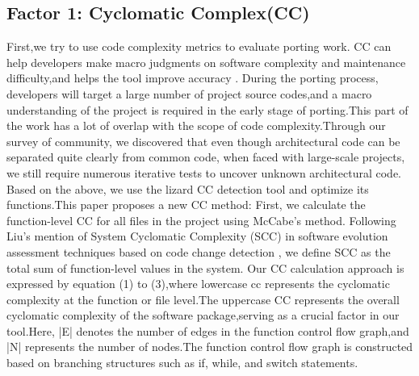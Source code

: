 \documentclass[sigconf,screen,review,anonymous]{acmart}
\begin{document}
\subsection{Factor 1: Cyclomatic Complex(CC)}
\label{sec:factor-1}
First,we try to use code complexity metrics to evaluate porting work.
CC can help developers make macro judgments on software complexity and maintenance difficulty,and helps the tool improve accuracy \cite{2005Exploring}.
During the porting process, developers will target a large number of project source codes,and a macro understanding of the project is required in the early stage of porting.This part of the work has a lot of overlap with the scope of code complexity.Through our survey of community, we discovered that even though architectural code can be separated quite clearly from common code, when faced with large-scale projects, we still require numerous iterative tests to uncover unknown architectural code.
Based on the above, we use the lizard CC detection tool and optimize its functions.This paper proposes a new CC method:
 First, we calculate the function-level CC for all files in the project using McCabe's method. Following Liu's mention of System Cyclomatic Complexity (SCC) in software evolution assessment techniques based on code change detection \cite{liuhuihui00}, we define SCC as the total sum of function-level values in the system.
  Our CC calculation approach is expressed by equation (1) to (3),where lowercase cc represents the cyclomatic complexity at the function or file level.The uppercase CC represents the overall cyclomatic complexity of the software package,serving as a crucial factor in our tool.Here, |E| denotes the number of edges in the function control flow graph,and |N| represents the number of nodes.The function control flow graph is constructed based on branching structures such as if, while, and switch statements. 
  
\end{document}
